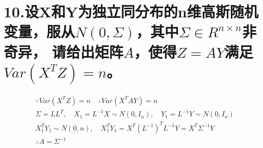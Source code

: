 \documentclass[UTF8]{ctexart}
\begin{document}
\section*{10.设X和Y为独立同分布的n维高斯随机变量，服从$N(0,\Sigma)$，其中$\Sigma\in R^{n\times n}$非奇异，
  请给出矩阵$A$，使得$Z=AY$满足$Var(X^TZ)=n$。}
\begin{equation*}
  \begin{aligned}
     & \because Var(X^TZ)=n\quad\therefore Var(X^TAY)=n                          \\
     & \Sigma=LL^T,\quad X_1=L^{-1}X\sim N(0,I_n),\quad Y_1=L^{-1}Y\sim N(0,I_n) \\
     & X_1^TY_1\sim N(0,n),\quad X_1^TY_1=X^T(L^{-1})^TL^{-1}Y=X^T\Sigma^{-1}Y   \\
     & \therefore A=\Sigma^{-1}
  \end{aligned}
\end{equation*}
\end{document}
